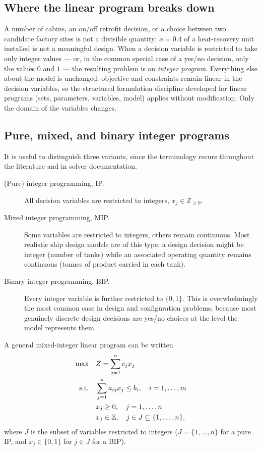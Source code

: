 \subsection{Where the linear program breaks down}

A number of cabins, an on/off retrofit decision, or a choice between two
candidate factory sites is not a divisible quantity: $x=0.4$ of a
heat-recovery unit installed is not a meaningful design. When a decision
variable is restricted to take only integer values --- or, in the common
special case of a yes/no decision, only the values $0$ and $1$ --- the
resulting problem is an \emph{integer program}. Everything else about the
model is unchanged: objective and constraints remain linear in the
decision variables, so the structured formulation discipline developed for
linear programs (sets, parameters, variables, model) applies without
modification. Only the domain of the variables changes.

\subsection{Pure, mixed, and binary integer programs}
\label{sec:ip-types}

It is useful to distinguish three variants, since the terminology recurs
throughout the literature and in solver documentation.

\begin{description}
  \item[(Pure) integer programming, IP.] All decision variables are
  restricted to integers, $x_j \in \mathbb{Z}_{\geq 0}$.
  \item[Mixed integer programming, MIP.] Some variables are restricted to
  integers, others remain continuous. Most realistic ship design models
  are of this type: a design decision might be integer (number of tanks)
  while an associated operating quantity remains continuous (tonnes of
  product carried in each tank).
  \item[Binary integer programming, BIP.] Every integer variable is
  further restricted to $\{0,1\}$. This is overwhelmingly the most common
  case in design and configuration problems, because most genuinely
  discrete design decisions are yes/no choices at the level the model
  represents them.
\end{description}

A general mixed-integer linear program can be written
\begin{align}
  \max \quad & Z = \sum_{j=1}^{n} c_j x_j \notag\\
  \text{s.t.} \quad & \sum_{j=1}^{n} a_{ij}x_j \leq b_i, \quad i=1,\ldots,m \notag\\
  & x_j \geq 0, \quad j=1,\ldots,n \notag\\
  & x_j \in \mathbb{Z}, \quad j \in J \subseteq \{1,\ldots,n\}, \notag
\end{align}
where $J$ is the subset of variables restricted to integers ($J=\{1,\ldots,n\}$
for a pure IP, and $x_j \in \{0,1\}$ for $j\in J$ for a BIP).

